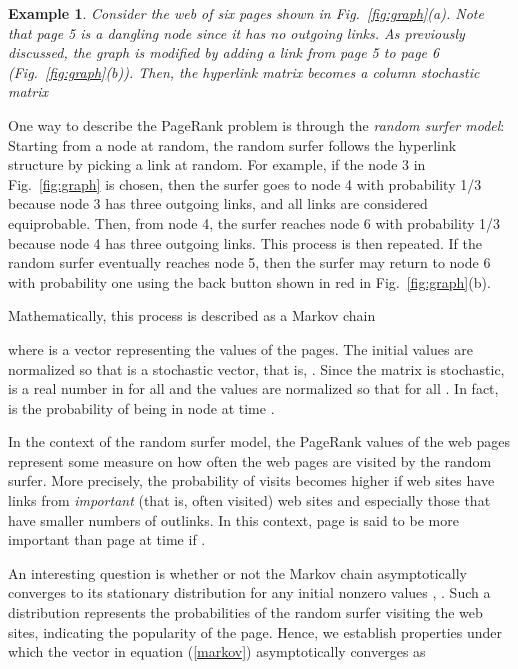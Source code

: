 \documentclass[11pt,draftcls,onecolumn]{IEEEtran}
\newtheorem{example}[theorem]{Example}
\newcommand{\End}{\hfill \mbox{}}
\begin{document}
\begin{example}\label{ex:1}\rm
Consider the web of six pages shown in Fig.~\ref{fig:graph}\;(a). 
Note that page 5 is a dangling node since it has no outgoing links.
As previously discussed, the graph is modified by adding a link from page 5 to
page 6 (Fig.~\ref{fig:graph}\;(b)). Then, the hyperlink matrix becomes a column stochastic matrix

\End
\end{example}

\vspace{.5cm}

One way to describe the PageRank problem is through 
the {\it random surfer model}: Starting from a node at random, 
the random surfer follows the hyperlink structure by picking a link at random. For example, 
if the node 3 in Fig.~\ref{fig:graph} is chosen, then the surfer goes to node 4 with probability 1/3 because 
node 3 has three outgoing links, and all links are considered equiprobable. Then,
from node 4, the surfer reaches node 6 with probability 1/3 because node 4 has three outgoing links. 
This process is then repeated. If the random surfer eventually reaches node 5, then the surfer may 
return to node 6  with probability one using the back button shown in red in 
Fig.~\ref{fig:graph}\;(b).

Mathematically, this process is described as a Markov chain 

where  is a vector representing the values of the pages. 
The initial values are normalized so that  is 
a stochastic vector, that is,
. 
Since the matrix  is stochastic,  is a real number 
in  for all  and the values are normalized so that 
 for all . 
In fact,  is the probability of being in
node  at time .

In the context of the random surfer model, the PageRank values of the web pages
represent some measure on how often the web pages are visited by the random surfer. 
More precisely, the probability of visits becomes higher if web sites have links 
from {\it important} (that is, often visited) web sites and especially those
that have smaller numbers of outlinks.
In this context, 
page  is said to be more important than page  at time  if .

An interesting question is whether or not the Markov chain asymptotically converges to its 
stationary distribution for any initial nonzero values , .
Such a distribution represents the probabilities of the random surfer visiting the
web sites, indicating the popularity of the page. 
Hence, we establish properties under which 
the vector  in equation (\ref{markov}) asymptotically converges as
\end{document}
